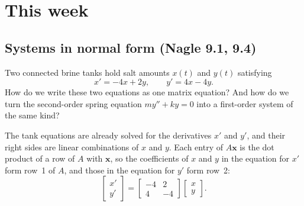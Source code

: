 \documentclass[10pt]{scrartcl}
\newcommand{\vv}[1]{\mathbf{#1}}
\begin{document}
\section{This week}
\subsection{Systems in normal form (Nagle 9.1, 9.4)}
\begin{qbox}
  Two connected brine tanks hold salt amounts $x(t)$ and $y(t)$ satisfying
  \[
    x'=-4x+2y, \qquad y'=4x-4y.
  \]
  How do we write these two equations as one matrix equation? And how do we turn the second-order spring equation $my''+ky=0$ into a first-order system of the same kind?
\end{qbox}

The tank equations are already solved for the derivatives $x'$ and $y'$, and their right sides are linear combinations of $x$ and $y$. Each entry of $A\vv x$ is the dot product of a row of $A$ with $\vv x$, so the coefficients of $x$ and $y$ in the equation for $x'$ form row~1 of $A$, and those in the equation for $y'$ form row~2:
\[
  \begin{bmatrix}x'\\y'\end{bmatrix} = \begin{bmatrix}-4&2\\4&-4\end{bmatrix}\begin{bmatrix}x\\y\end{bmatrix}.
\]
\end{document}
